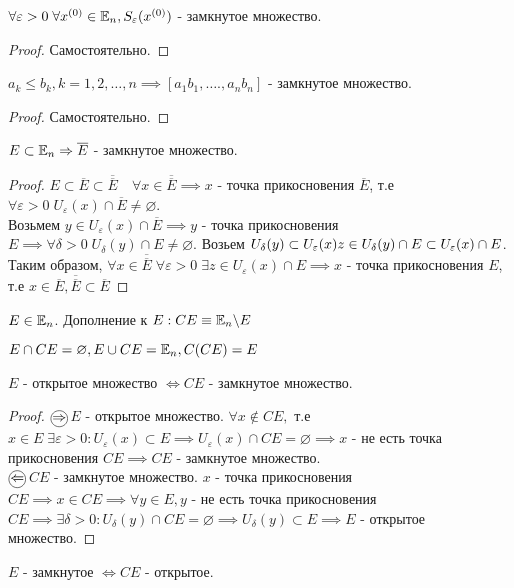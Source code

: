 \documentclass[../main.tex]{subfiles}
\begin{document}
\begin{lemma}
    $\forall \varepsilon>0 \; \forall x^{(0)}\in\mathbb{E}_{n}, S_{\varepsilon}(x^{(0)})$ - замкнутое множество. 
\end{lemma}
\begin{proof}
    Самостоятельно. 
\end{proof}
\begin{lemma}
    $a_{k}\leqslant b_{k}, k = 1,2,\dots ,n\implies [a_{1}b_{1},\dots.,a_{n}b_{n}]$ - замкнутое множество.
\end{lemma}
\begin{proof}
    Самостоятельно. 
\end{proof}
\begin{lemma}
    $E \subset \mathbb{E}_{n} \Rightarrow \overline{E}$ - замкнутое множество. 
\end{lemma}
\begin{proof}
    $E \subset \overline{E} \subset \overline{\overline{E}}\quad \forall x \in \overline{\overline{E}}\implies x$ - точка прикосновения $\overline{E}$, т.е $\forall \varepsilon>0 \; U_{\varepsilon}(x)\cap \overline{E}\neq  \varnothing$. 
    \\Возьмем $y \in U_{\varepsilon}(x)\cap \overline{E}\implies y $ - точка прикосновения $E\implies \forall \delta>0 \; U_{\delta}(y)\cap E \neq  \varnothing$. Возьем $U_{\delta}(y) \subset U_{\varepsilon}(x)\\ z\in U_{\delta}(y)\cap E \subset U_{\varepsilon}(x) \cap E$. Таким образом, $\forall x \in \overline{\overline{E}}\; \forall \varepsilon>0 \;\exists z \in U_{\varepsilon}(x) \cap E \implies x$ - точка прикосновения $E$, т.е $x \in \overline{E}, \overline{\overline{E}} \subset \overline{E}$
\end{proof}
\begin{definition}
    $E\in\mathbb{E}_{n}$. Дополнение к $E: CE \equiv \mathbb{E}_{n}\backslash E$
\end{definition}
$E\cap CE = \varnothing, E\cup CE = \mathbb{E}_{n}, C(CE) = E$

\begin{lemma}
    $E$ - открытое множество $\Leftrightarrow CE$ - замкнутое множество.
\end{lemma}
\begin{proof}
    $\tcircle{$\implies$}$ $E$ - открытое множество. $\forall x \notin CE,$ т.е $x \in E\; \exists \varepsilon>0: U_{\varepsilon}(x)\subset E\implies U_{\varepsilon}(x)\cap CE = \varnothing\implies x$ - не есть точка прикосновения $CE\implies CE $ - замкнутое множество. 
    \\$\tcircle{$\impliedby$}$ $CE$ - замкнутое множество. $x$ - точка прикосновения $CE\implies x\in CE \implies \forall y \in E, y$ - не есть точка прикосновения $CE\implies \exists \delta>0: U_{\delta}(y)\cap CE = \varnothing\implies U_{\delta}(y)\subset E \implies E$ - открытое множество.
\end{proof}
\begin{corollary}
    $E$ - замкнутое $\Leftrightarrow CE$ - открытое. 
\end{corollary}
\end{document}
